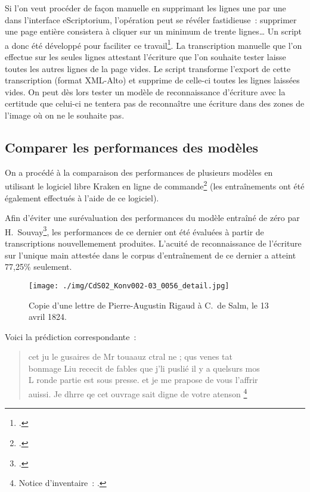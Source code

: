 \documentclass[a4paper,12pt,twoside]{book}
\begin{document}
				Si l'on veut procéder de façon manuelle en supprimant les lignes une par une dans l'interface eScriptorium, l'opération peut se révéler fastidieuse~: supprimer une page entière consistera à cliquer sur un minimum de trente lignes… Un script a donc été développé pour faciliter ce travail\footcite{biaySupprLignesVidesPy2022}. La transcription manuelle que l'on effectue sur les seules lignes attestant l'écriture que l'on souhaite tester laisse toutes les autres lignes de la page vides. Le script transforme l'export de cette transcription (format XML-Alto) et supprime de celle-ci toutes les lignes laissées vides. On peut dès lors tester un modèle de reconnaissance d'écriture avec la certitude que celui-ci ne tentera pas de reconnaître une écriture dans des zones de l'image où on ne le souhaite pas.
				
			\subsection{Comparer les performances des modèles}
				On a procédé à la comparaison des performances de plusieurs modèles en utilisant le logiciel libre Kraken en ligne de commande\footcite{KrakenDocumentation} (les entraînements ont été également effectués à l'aide de ce logiciel).
				
				Afin d'éviter une surévaluation des performances du modèle entraîné de zéro par H.~Souvay\footcite{souvayCorrespondanceConstanceSalm2021}, les performances de ce dernier ont été évaluées à partir de transcriptions nouvellemement produites. L'acuité de reconnaissance de l'écriture sur l'unique main attestée dans le corpus d'entraînement de ce dernier a atteint 77,25\% seulement. 
				
				\begin{figure}[!h]
					\centering
					\texttt{[image: ./img/CdS02\_Konv002-03\_0056\_detail.jpg]}%
					\caption{Copie d'une lettre de Pierre-Augustin Rigaud à C.~de Salm, le 13 avril 1824.}%
					\label{lettre-rigaud}%
				\end{figure}
				
				Voici la prédiction correspondante~:
				
				\begin{quote}
					\textsf{cet ju le gusaires de Mr touaauz ctral ne ; qus venes tat\\
					bonmage Liu rececit de fables que j'li puslié il y a quelsurs mos\\
					L ronde partie est sous presse. et je me prapose de vous l'affrir\\
					auissi. Je dhrre qe cet ouvrage sait digne de votre atenson
					\footnote{Notice d'inventaire~: \cite{CdS02056}.}}
				\end{quote}
				
\end{document}
